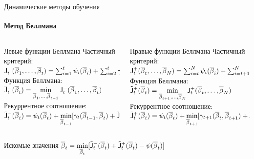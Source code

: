 \documentclass[11pt]{beamer}
\let\ov\overline
\def\bar_#1{\bold{\ov{#1}}}
\def\msf_#1{\mathsf{#1}}
\begin{document}
\begin{frame}{Динамические методы обучения}
\framesubtitle{Метод Беллмана}
\begin{columns}[T]
\begin{column}{.5\textwidth}
   	  \begin{block}{Левые функции Беллмана}
Частичный критерий:\ 
		$\msf_J_t^{-}(\bar_\beta_1, \dots, \bar_\beta_t) = \sum_{i=1}^t \psi_i(\bar_\beta_i) + \sum_{i=2}^t \gamma_i(\bar_\beta_{i-1}, \bar_\beta_i)$\\
Функция Беллмана:\\
		$\tilde{\msf_J}_t^{-}(\bar_\beta_t) = \displaystyle\min_{\bar_\beta_1,\dots,\bar_\beta_{t-1}}\msf_J_t^{-}(\bar_\beta_1, \dots, \bar_\beta_t) $\\
Рекуррентное соотношение:\
		$\tilde{\msf_J}_t^{-}(\bar_\beta_t) =\psi_t(\bar_\beta_t) +  \displaystyle\min_{\bar_\beta_{t-1}}[\gamma_t(\bar_\beta_{t-1}, \bar_\beta_t)+\tilde{\msf_J}_{t-1}^{-}(\bar_\beta_{t-1})]$\\
    \end{block}
    \end{column}
    \begin{column}{.5\textwidth}
     \begin{block}{Правые функции Беллмана}
Частичный критерий:\ 
		$\msf_J_t^{+}(\bar_\beta_t, \dots, \bar_\beta_N) = \sum_{i=t}^N \psi_i(\bar_\beta_i) + \sum_{i=t+1}^N \gamma_i(\bar_\beta_{i-1}, \bar_\beta_i)$ \\
Функция Беллмана:\
		$\tilde{\msf_J}_t^{+}(\bar_\beta_t) = \displaystyle\min_{\bar_\beta_{t+1},\dots,\bar_\beta_N}\msf_J_t^{+}(\bar_\beta_t, \dots, \bar_\beta_N)$\\
Рекуррентное соотношение:\
		$\tilde{\msf_J}_t^{+}(\bar_\beta_t) =\psi_t(\bar_\beta_t) + \displaystyle\min_{\bar_\beta_{t+1}}[\gamma_{t+1}(\bar_\beta_{t}, \bar_\beta_{t+1})+\tilde{\msf_J}_{t+1}^{-}(\bar_\beta_{t+1})]$\\
    \end{block}
    \end{column}
\end{columns}
\qquad Искомые значения $\bar_\beta_t = \displaystyle\min_{\bar_\beta_t}[\tilde{\msf_J}_t^{-}(\bar_\beta_t) + \tilde{\msf_J}_t^{+}(\bar_\beta_t) - \psi(\bar_\beta_t)]$
\end{frame}
\end{document}
